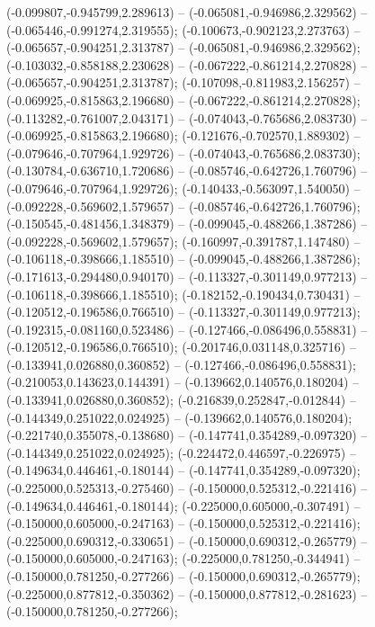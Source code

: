  (-0.099807,-0.945799,2.289613) -- (-0.065081,-0.946986,2.329562) -- (-0.065446,-0.991274,2.319555);
 (-0.100673,-0.902123,2.273763) -- (-0.065657,-0.904251,2.313787) -- (-0.065081,-0.946986,2.329562);
 (-0.103032,-0.858188,2.230628) -- (-0.067222,-0.861214,2.270828) -- (-0.065657,-0.904251,2.313787);
 (-0.107098,-0.811983,2.156257) -- (-0.069925,-0.815863,2.196680) -- (-0.067222,-0.861214,2.270828);
 (-0.113282,-0.761007,2.043171) -- (-0.074043,-0.765686,2.083730) -- (-0.069925,-0.815863,2.196680);
 (-0.121676,-0.702570,1.889302) -- (-0.079646,-0.707964,1.929726) -- (-0.074043,-0.765686,2.083730);
 (-0.130784,-0.636710,1.720686) -- (-0.085746,-0.642726,1.760796) -- (-0.079646,-0.707964,1.929726);
 (-0.140433,-0.563097,1.540050) -- (-0.092228,-0.569602,1.579657) -- (-0.085746,-0.642726,1.760796);
 (-0.150545,-0.481456,1.348379) -- (-0.099045,-0.488266,1.387286) -- (-0.092228,-0.569602,1.579657);
 (-0.160997,-0.391787,1.147480) -- (-0.106118,-0.398666,1.185510) -- (-0.099045,-0.488266,1.387286);
 (-0.171613,-0.294480,0.940170) -- (-0.113327,-0.301149,0.977213) -- (-0.106118,-0.398666,1.185510);
 (-0.182152,-0.190434,0.730431) -- (-0.120512,-0.196586,0.766510) -- (-0.113327,-0.301149,0.977213);
 (-0.192315,-0.081160,0.523486) -- (-0.127466,-0.086496,0.558831) -- (-0.120512,-0.196586,0.766510);
 (-0.201746,0.031148,0.325716) -- (-0.133941,0.026880,0.360852) -- (-0.127466,-0.086496,0.558831);
 (-0.210053,0.143623,0.144391) -- (-0.139662,0.140576,0.180204) -- (-0.133941,0.026880,0.360852);
 (-0.216839,0.252847,-0.012844) -- (-0.144349,0.251022,0.024925) -- (-0.139662,0.140576,0.180204);
 (-0.221740,0.355078,-0.138680) -- (-0.147741,0.354289,-0.097320) -- (-0.144349,0.251022,0.024925);
 (-0.224472,0.446597,-0.226975) -- (-0.149634,0.446461,-0.180144) -- (-0.147741,0.354289,-0.097320);
 (-0.225000,0.525313,-0.275460) -- (-0.150000,0.525312,-0.221416) -- (-0.149634,0.446461,-0.180144);
 (-0.225000,0.605000,-0.307491) -- (-0.150000,0.605000,-0.247163) -- (-0.150000,0.525312,-0.221416);
 (-0.225000,0.690312,-0.330651) -- (-0.150000,0.690312,-0.265779) -- (-0.150000,0.605000,-0.247163);
 (-0.225000,0.781250,-0.344941) -- (-0.150000,0.781250,-0.277266) -- (-0.150000,0.690312,-0.265779);
 (-0.225000,0.877812,-0.350362) -- (-0.150000,0.877812,-0.281623) -- (-0.150000,0.781250,-0.277266);
